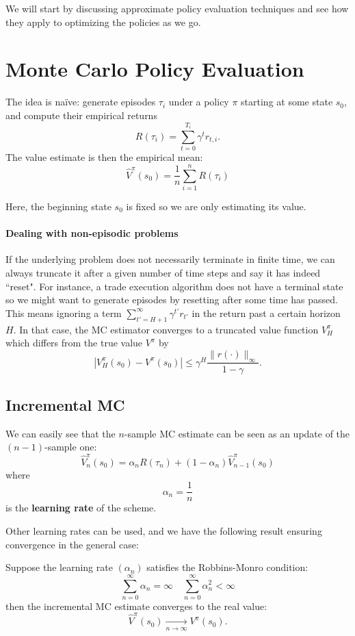 \documentclass[../course-notes.tex]{subfiles}
\begin{document}
We will start by discussing approximate policy evaluation techniques and see how they apply to optimizing the policies as we go.


\section{Monte Carlo Policy Evaluation}

The idea is naïve: generate episodes $\tau_i$ under a policy $\pi$ starting at some state $s_0$, and compute their empirical returns
\[
	R(\tau_i) = \sum_{t=0}^{T_i} \gamma^t r_{t,i}.
\]
The value estimate is then the empirical mean:
\begin{equation}
	\widehat{V}^\pi(s_0) = \frac{1}{n}\sum_{i=1}^{n} R(\tau_i)
\end{equation}

Here, the beginning state $s_0$ is fixed so we are only estimating its value.


\paragraph{Dealing with non-episodic problems} If the underlying problem does not necessarily terminate in finite time, we can always truncate it after a given number of time steps and say it has indeed ``reset". For instance, a trade execution algorithm does not have a terminal state so we might want to generate episodes by resetting after some time has passed. This means ignoring a term $\sum_{t'=H+1}^\infty \gamma^{t'} r_{t'}$ in the return past a certain horizon $H$. In that case, the MC estimator converges to a truncated value function $V_H^\pi$ which differs from the true value $V^\pi$ by
\[
	|V_H^\pi(s_0) - V^\pi(s_0)| \leq \gamma^H\frac{\| r(\cdot)\|_\infty}{1 - \gamma}.
\]


\subsection{Incremental MC}

We can easily see that the $n$-sample MC estimate can be seen as an update of the $(n-1)$-sample one:
\[
	\widehat{V}_{n}^\pi(s_0) = \alpha_n R(\tau_{n}) + (1-\alpha_n) \widehat{V}^\pi_{n-1}(s_0)
\]
where
\[
	\alpha_n = \frac{1}{n}
\]
is the \textbf{learning rate} of the scheme.

Other learning rates can be used, and we have the following result ensuring convergence in the general case:
\begin{prop}
	Suppose the learning rate $(\alpha_n)$ satisfies the Robbins-Monro condition:
	\begin{equation}
	\sum_{n=0}^{\infty} \alpha_n = \infty \quad
	\sum_{n=0}^{\infty} \alpha_n^2 < \infty
	\end{equation}
	then the incremental MC estimate converges to the real value:
	\[
		\widehat{V}^\pi(s_0) \xrightarrow[n\to\infty]{} V^\pi(s_0).
	\]
\end{prop}
\end{document}
